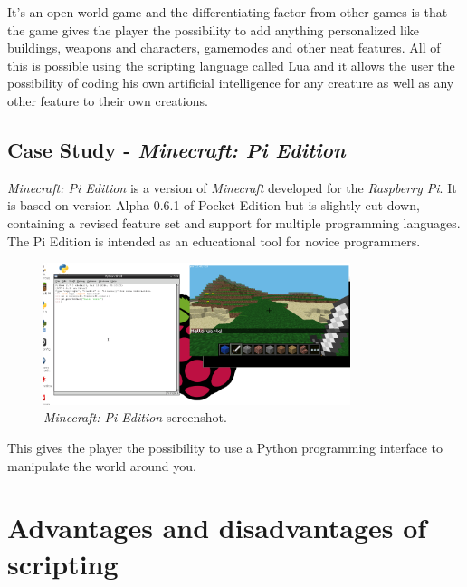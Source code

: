 \documentclass[12pt]{article}
\begin{document}
It's an open-world game and the differentiating factor from other games is that the game gives the player the possibility to add anything personalized like buildings, weapons and characters, gamemodes and other neat features. All of this is possible using the scripting language called Lua and it allows the user the possibility of coding his own artificial intelligence for any creature as well as any other feature to their own creations.


\subsection{Case Study -  \textit{Minecraft: Pi Edition}}

\textit{Minecraft: Pi Edition} is a version of \textit{Minecraft} developed for the \textit{Raspberry Pi}. It is based on version Alpha 0.6.1 of Pocket Edition but is slightly cut down, containing a revised feature set and support for multiple programming languages. The Pi Edition is intended as an educational tool for novice programmers.

\begin{figure}[h!]
    \centering
    \includegraphics[width=0.8\textwidth]{mine.png}
    \caption{\textit{Minecraft: Pi Edition} screenshot.}
    \label{fig:awesome_image}
\end{figure}

This gives the player the possibility to use a Python programming interface to manipulate the world around you.

\section{Advantages and disadvantages of scripting}
\end{document}
